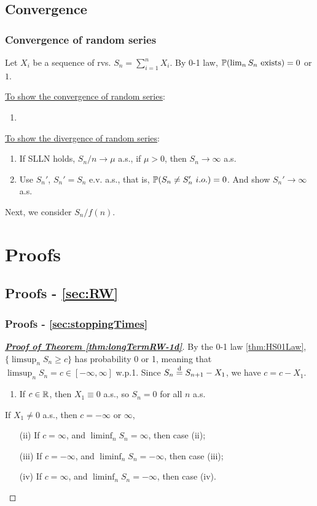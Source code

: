 \documentclass[10pt,a4paper]{article}
\begin{document}
\subsection{Convergence}\label{sec:tech-cvg}
\subsubsection{Convergence of random series}\label{sec:tech-cvg-rseries}
Let $X_i$ be a sequence of rvs. $S_n=\sum_{i=1}^{n}X_i$. By 0-1 law, $\mathbb P(\lim_{n}S_n \text{ exists})=0$ or $1$.   

\underline{To show the convergence of random series}:
\begin{enumerate}
	\item 
\end{enumerate}

\underline{To show the divergence of random series}:
\begin{enumerate}
	\item If SLLN holds, $S_n/n \to \mu$ a.s., if $\mu>0$, then $S_n\to \infty$ a.s.
	\item Use $S_n'$, $S_n'=S_n$ e.v. a.s., that is, $\bbP(S_n\neq S_n' \ i.o.)=0$. And show $S_n'\to \infty $ a.s.   
\end{enumerate}

Next, we consider $S_n/f(n)$. 


\appendix
\section{Proofs}\label{sec:proof}
\subsection{Proofs - \ref{sec:RW}}\label{sec:proof-RW}
\subsubsection{Proofs - \ref{sec:stoppingTimes}}\label{sec:proof-stoppingTimes}
\begin{proof}[\underline{\textbf{Proof of Theorem \ref{thm:longTermRW-1d}}}]
	By the 0-1 law \ref{thm:HS01Law}, $\{\limsup_n S_n\geq c\}$ has probability 0 or 1, meaning that $\limsup_n S_n=c\in [-\infty ,\infty ]$ w.p.1. Since $S_n \stackrel{\mathrm{d}}{=} S_{n+1}-X_{1}$, we have $c=c-X_1$.
\begin{enumerate}[label=(\roman*)]
	\item If $c\in\mathbb R$, then $X_1\equiv 0$ a.s., so $S_n=0$ for all $n$ a.s.
\end{enumerate}
If $X_1\neq 0$ a.s., then $c=-\infty $ or $\infty $,   
\begin{enumerate}
	\item[(ii)] If $c=\infty $, and $\liminf_n S_n=\infty $, then case (ii);
	\item[(iii)] If $c=-\infty $, and $\liminf_n S_n=-\infty $, then case (iii);
	\item[(iv)] If $c=\infty $, and $\liminf_n S_n=-\infty $, then case (iv).       
\end{enumerate}
\end{proof}
\end{document}

